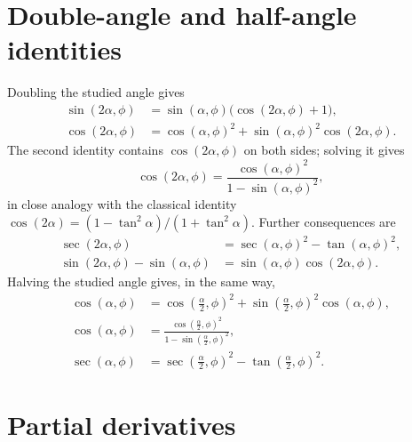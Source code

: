 \section{Double-angle and half-angle identities}\label{app:gs-double}

Doubling the studied angle gives
\begin{align}
\sin(2\alpha, \phi) &= \sin(\alpha, \phi)\bigl(\cos(2\alpha, \phi) + 1\bigr), \\
\cos(2\alpha, \phi) &= \cos(\alpha, \phi)^2 + \sin(\alpha, \phi)^2\cos(2\alpha, \phi).
\end{align}
The second identity contains $\cos(2\alpha, \phi)$ on both sides; solving it gives
\begin{equation}
\cos(2\alpha, \phi) = \frac{\cos(\alpha, \phi)^2}{1 - \sin(\alpha, \phi)^2},
\end{equation}
in close analogy with the classical identity $\cos(2\alpha) = (1 - \tan^2\alpha)/(1 + \tan^2\alpha)$. Further consequences are
\begin{align}
\sec(2\alpha, \phi) &= \sec(\alpha, \phi)^2 - \tan(\alpha, \phi)^2, \\
\sin(2\alpha, \phi) - \sin(\alpha, \phi) &= \sin(\alpha, \phi)\cos(2\alpha, \phi).
\end{align}
Halving the studied angle gives, in the same way,
\begin{align}
\cos(\alpha, \phi) &= \cos\left(\tfrac{\alpha}{2}, \phi\right)^2 + \sin\left(\tfrac{\alpha}{2}, \phi\right)^2\cos(\alpha, \phi), \\
\cos(\alpha, \phi) &= \frac{\cos\left(\frac{\alpha}{2}, \phi\right)^2}{1 - \sin\left(\frac{\alpha}{2}, \phi\right)^2}, \\
\sec(\alpha, \phi) &= \sec\left(\tfrac{\alpha}{2}, \phi\right)^2 - \tan\left(\tfrac{\alpha}{2}, \phi\right)^2 .
\end{align}

\section{Partial derivatives}\label{app:gs-derivatives}

